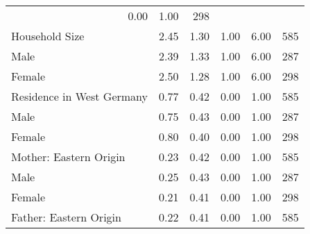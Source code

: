 \documentclass{article}
\begin{document}
\begin{table}[ht]
{\begin{tabular}{llllll}
  \multicolumn{1}{r}{0.00} &
  \multicolumn{1}{r}{1.00} &
  \multicolumn{1}{r}{298} \\
\multicolumn{1}{l}{Household Size} &
  \multicolumn{1}{r}{2.45} &
  \multicolumn{1}{r}{1.30} &
  \multicolumn{1}{r}{1.00} &
  \multicolumn{1}{r}{6.00} &
  \multicolumn{1}{r}{585} \\
\multicolumn{1}{l}{\hspace{1em}Male} &
  \multicolumn{1}{r}{2.39} &
  \multicolumn{1}{r}{1.33} &
  \multicolumn{1}{r}{1.00} &
  \multicolumn{1}{r}{6.00} &
  \multicolumn{1}{r}{287} \\
\multicolumn{1}{l}{\hspace{1em}Female} &
  \multicolumn{1}{r}{2.50} &
  \multicolumn{1}{r}{1.28} &
  \multicolumn{1}{r}{1.00} &
  \multicolumn{1}{r}{6.00} &
  \multicolumn{1}{r}{298} \\
\multicolumn{1}{l}{Residence in West Germany} &
  \multicolumn{1}{r}{0.77} &
  \multicolumn{1}{r}{0.42} &
  \multicolumn{1}{r}{0.00} &
  \multicolumn{1}{r}{1.00} &
  \multicolumn{1}{r}{585} \\
\multicolumn{1}{l}{\hspace{1em}Male} &
  \multicolumn{1}{r}{0.75} &
  \multicolumn{1}{r}{0.43} &
  \multicolumn{1}{r}{0.00} &
  \multicolumn{1}{r}{1.00} &
  \multicolumn{1}{r}{287} \\
\multicolumn{1}{l}{\hspace{1em}Female} &
  \multicolumn{1}{r}{0.80} &
  \multicolumn{1}{r}{0.40} &
  \multicolumn{1}{r}{0.00} &
  \multicolumn{1}{r}{1.00} &
  \multicolumn{1}{r}{298} \\
\multicolumn{1}{l}{Mother: Eastern Origin} &
  \multicolumn{1}{r}{0.23} &
  \multicolumn{1}{r}{0.42} &
  \multicolumn{1}{r}{0.00} &
  \multicolumn{1}{r}{1.00} &
  \multicolumn{1}{r}{585} \\
\multicolumn{1}{l}{\hspace{1em}Male} &
  \multicolumn{1}{r}{0.25} &
  \multicolumn{1}{r}{0.43} &
  \multicolumn{1}{r}{0.00} &
  \multicolumn{1}{r}{1.00} &
  \multicolumn{1}{r}{287} \\
\multicolumn{1}{l}{\hspace{1em}Female} &
  \multicolumn{1}{r}{0.21} &
  \multicolumn{1}{r}{0.41} &
  \multicolumn{1}{r}{0.00} &
  \multicolumn{1}{r}{1.00} &
  \multicolumn{1}{r}{298} \\
\multicolumn{1}{l}{Father: Eastern Origin} &
  \multicolumn{1}{r}{0.22} &
  \multicolumn{1}{r}{0.41} &
  \multicolumn{1}{r}{0.00} &
  \multicolumn{1}{r}{1.00} &
  \multicolumn{1}{r}{585} \\

\end{tabular}}
\end{table}
\end{document}
